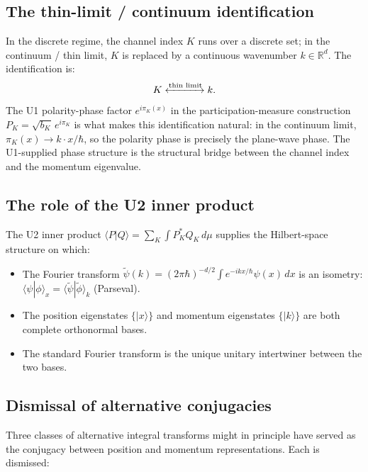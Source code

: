\documentclass[11pt,a4paper]{article}
\begin{document}
\subsection{The thin-limit / continuum identification}

In the discrete regime, the channel index $K$ runs over a discrete set; in the continuum / thin limit, $K$ is replaced by a continuous wavenumber $k \in \mathbb{R}^d$. The identification is:
\begin{equation}
K \xleftrightarrow{\text{thin limit}} k. \label{eq:Kk}
\end{equation}
The U1 polarity-phase factor $e^{i\pi_K(x)}$ in the participation-measure construction $P_K = \sqrt{b_K} \, e^{i\pi_K}$ is what makes this identification natural: in the continuum limit, $\pi_K(x) \to k \cdot x / \hbar$, so the polarity phase is precisely the plane-wave phase. The U1-supplied phase structure is the structural bridge between the channel index and the momentum eigenvalue.

\subsection{The role of the U2 inner product}

The U2 inner product $\langle P | Q \rangle = \sum_K \int P_K^* Q_K \, d\mu$ supplies the Hilbert-space structure on which:

\begin{itemize}
  \item[\textbf{(i)}] The Fourier transform $\widetilde{\psi}(k) = (2\pi\hbar)^{-d/2} \int e^{-ikx/\hbar} \psi(x) \, dx$ is an isometry: $\langle \psi | \phi \rangle_x = \langle \widetilde{\psi} | \widetilde{\phi} \rangle_k$ (Parseval).
  \item[\textbf{(ii)}] The position eigenstates $\{|x\rangle\}$ and momentum eigenstates $\{|k\rangle\}$ are both complete orthonormal bases.
  \item[\textbf{(iii)}] The standard Fourier transform is the unique unitary intertwiner between the two bases.
\end{itemize}

\subsection{Dismissal of alternative conjugacies}\label{sec:alternatives}

Three classes of alternative integral transforms might in principle have served as the conjugacy between position and momentum representations. Each is dismissed:
\end{document}
